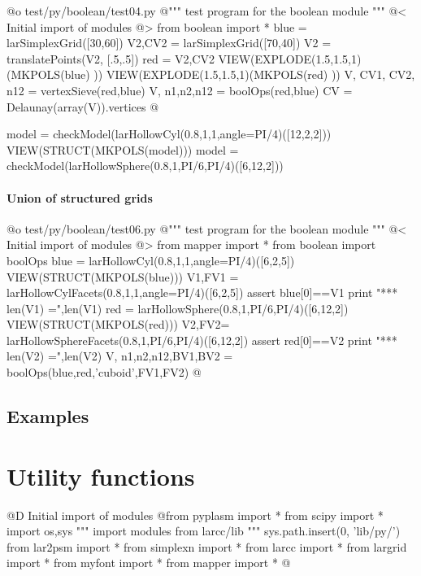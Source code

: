 \documentclass[11pt,oneside]{article}	%
\begin{document}
@o test/py/boolean/test04.py
@{""" test program for the boolean module """
@< Initial import of modules @>
from boolean import *
blue = larSimplexGrid([30,60])
V2,CV2 = larSimplexGrid([70,40])
V2 = translatePoints(V2, [.5,.5])
red = V2,CV2
VIEW(EXPLODE(1.5,1.5,1)(MKPOLS(blue) ))
VIEW(EXPLODE(1.5,1.5,1)(MKPOLS(red) ))
V, CV1, CV2, n12 = vertexSieve(red,blue)
V, n1,n2,n12 = boolOps(red,blue)
CV = Delaunay(array(V)).vertices
@}


model = checkModel(larHollowCyl(0.8,1,1,angle=PI/4)([12,2,2]))
VIEW(STRUCT(MKPOLS(model)))
model = checkModel(larHollowSphere(0.8,1,PI/6,PI/4)([6,12,2]))


\paragraph{Union of structured grids}

@o test/py/boolean/test06.py
@{""" test program for the boolean module """
@< Initial import of modules @>
from mapper import *
from boolean import boolOps
blue = larHollowCyl(0.8,1,1,angle=PI/4)([6,2,5])
VIEW(STRUCT(MKPOLS(blue)))
V1,FV1 = larHollowCylFacets(0.8,1,1,angle=PI/4)([6,2,5])
assert blue[0]==V1
print "*** len(V1) =",len(V1)
red = larHollowSphere(0.8,1,PI/6,PI/4)([6,12,2])
VIEW(STRUCT(MKPOLS(red)))
V2,FV2= larHollowSphereFacets(0.8,1,PI/6,PI/4)([6,12,2])
assert red[0]==V2
print "*** len(V2) =",len(V2)
V, n1,n2,n12,BV1,BV2 = boolOps(blue,red,'cuboid',FV1,FV2)
@}

\subsection{Examples}
\appendix
\section{Utility functions}
@D Initial import of modules
@{from pyplasm import *
from scipy import *
import os,sys
""" import modules from larcc/lib """
sys.path.insert(0, 'lib/py/')
from lar2psm import *
from simplexn import *
from larcc import *
from largrid import *
from myfont import *
from mapper import *
@}
\end{document}
